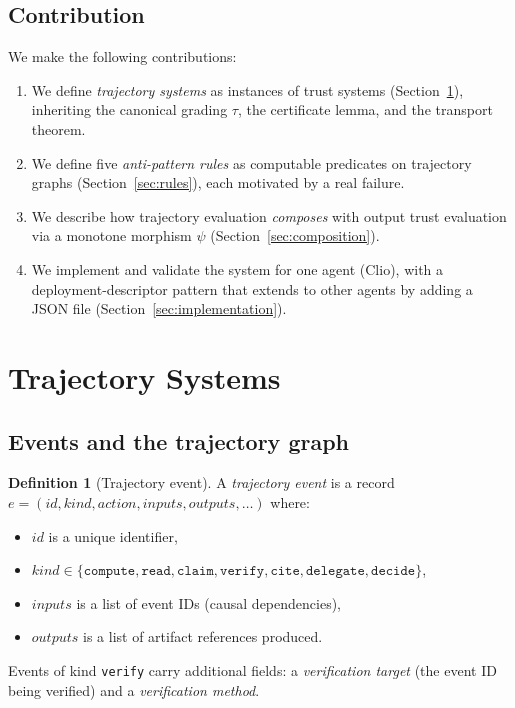 \documentclass[11pt,a4paper]{article}
\theoremstyle{definition}
\newtheorem{definition}{Definition}[section]
\theoremstyle{plain}
\theoremstyle{remark}
\begin{document}
\subsection{Contribution}

We make the following contributions:
\begin{enumerate}
\item We define \emph{trajectory systems} as instances of trust systems (Section~\ref{sec:trajectory-systems}), inheriting the canonical grading $\tau$, the certificate lemma, and the transport theorem.
\item We define five \emph{anti-pattern rules} as computable predicates on trajectory graphs (Section~\ref{sec:rules}), each motivated by a real failure.
\item We describe how trajectory evaluation \emph{composes} with output trust evaluation via a monotone morphism $\psi$ (Section~\ref{sec:composition}).
\item We implement and validate the system for one agent (Clio), with a deployment-descriptor pattern that extends to other agents by adding a JSON file (Section~\ref{sec:implementation}).
\end{enumerate}

\section{Trajectory Systems}\label{sec:trajectory-systems}

\subsection{Events and the trajectory graph}

\begin{definition}[Trajectory event]
A \emph{trajectory event} is a record $e = (\mathit{id}, \mathit{kind}, \mathit{action}, \mathit{inputs}, \mathit{outputs}, \ldots)$ where:
\begin{itemize}
\item $\mathit{id}$ is a unique identifier,
\item $\mathit{kind} \in \{\texttt{compute}, \texttt{read}, \texttt{claim}, \texttt{verify}, \texttt{cite}, \texttt{delegate}, \texttt{decide}\}$,
\item $\mathit{inputs}$ is a list of event IDs (causal dependencies),
\item $\mathit{outputs}$ is a list of artifact references produced.
\end{itemize}
Events of kind \texttt{verify} carry additional fields: a \emph{verification target} (the event ID being verified) and a \emph{verification method}.
\end{definition}
\end{document}
